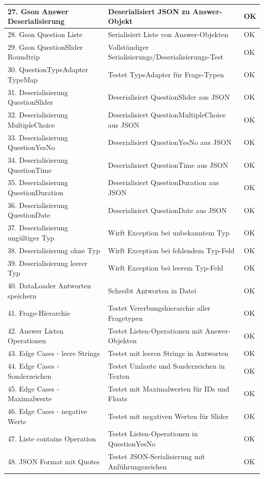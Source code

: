 \documentclass[a4paper,12pt]{article}
\begin{document}
\begin{tabularx}{\textwidth}{|l|X|l|}
\hline
27. Gson Answer Deserialisierung & Deserialisiert JSON zu Answer-Objekt & OK \\
\hline
28. Gson Question Liste & Serialisiert Liste von Answer-Objekten & OK \\
\hline
29. Gson QuestionSlider Roundtrip & Vollständiger Serialisierungs/Deserialisierungs-Test & OK \\
\hline
30. QuestionTypeAdapter TypeMap & Testet TypeAdapter für Frage-Typen & OK \\
\hline
31. Deserialisierung QuestionSlider & Deserialisiert QuestionSlider aus JSON & OK \\
\hline
32. Deserialisierung MultipleChoice & Deserialisiert QuestionMultipleChoice aus JSON & OK \\
\hline
33. Deserialisierung QuestionYesNo & Deserialisiert QuestionYesNo aus JSON & OK \\
\hline
34. Deserialisierung QuestionTime & Deserialisiert QuestionTime aus JSON & OK \\
\hline
35. Deserialisierung QuestionDuration & Deserialisiert QuestionDuration aus JSON & OK \\
\hline
36. Deserialisierung QuestionDate & Deserialisiert QuestionDate aus JSON & OK \\
\hline
37. Deserialisierung ungültiger Typ & Wirft Exception bei unbekanntem Typ & OK \\
\hline
38. Deserialisierung ohne Typ & Wirft Exception bei fehlendem Typ-Feld & OK \\
\hline
39. Deserialisierung leerer Typ & Wirft Exception bei leerem Typ-Feld & OK \\
\hline
40. DataLoader Antworten speichern & Schreibt Antworten in Datei & OK \\
\hline
41. Frage-Hierarchie & Testet Vererbungshierarchie aller Fragetypen & OK \\
\hline
42. Answer Listen Operationen & Testet Listen-Operationen mit Answer-Objekten & OK \\
\hline
43. Edge Cases - leere Strings & Testet mit leeren Strings in Antworten & OK \\
\hline
44. Edge Cases - Sonderzeichen & Testet Umlaute und Sonderzeichen in Texten & OK \\
\hline
45. Edge Cases - Maximalwerte & Testet mit Maximalwerten für IDs und Floats & OK \\
\hline
46. Edge Cases - negative Werte & Testet mit negativen Werten für Slider & OK \\
\hline
47. Liste contains Operation & Testet Listen-Operationen in QuestionYesNo & OK \\
\hline
48. JSON Format mit Quotes & Testet JSON-Serialisierung mit Anführungszeichen & OK \\
\hline
\end{tabularx}
\end{document}
